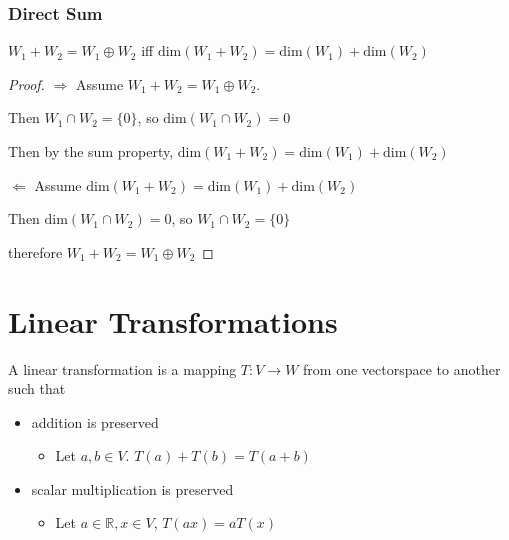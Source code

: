 \documentclass[11pt]{article}
\begin{document}
\subsubsection{Direct Sum}
\label{sec:orgheadline8}

\(W_1 + W_2 = W_1 \oplus W_2\) iff \(\text{dim} (W_1 + W_2) = \text{dim} (W_1) + \text{dim} (W_2)\)

\begin{proof}
\(\Rightarrow\) Assume \(W_1 + W_2 = W_1 \oplus W_2\).

Then \(W_1 \cap W_2 = \{0\}\), so \(\text{dim} (W_1 \cap W_2) = 0\)

Then by the sum property, \(\text{dim} (W_1 + W_2) = \text{dim} (W_1) + \text{dim} (W_2)\)

\(\Leftarrow\) Assume \(\text{dim} ( W_1 + W_2) = \text{dim} (W_1) + \text{dim} (W_2)\)

Then \(\text{dim} (W_1 \cap W_2) = 0\), so \(W_1 \cap W_2 = \{0\}\)

therefore \(W_1 + W_2 = W_1 \oplus W_2\)
\end{proof}

\section{Linear Transformations}
\label{sec:orgheadline12}
\begin{definition}
A linear transformation is a mapping \(T:V \rightarrow W\) from one vectorspace to another such that

\begin{itemize}
\item addition is preserved

\begin{itemize}
\item Let \(a,b \in V\).  \(T(a) + T(b) = T(a + b)\)
\end{itemize}

\item scalar multiplication is preserved

\begin{itemize}
\item Let \(a \in \mathbb{R}, x \in V\), \(T(ax) = aT(x)\)
\end{itemize}
\end{itemize}
\end{definition}
\end{document}
